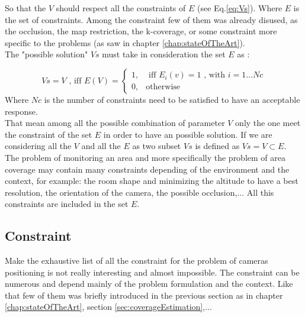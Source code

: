 So that the $V$ should respect all the constraints of $E$ (see Eq.\ref{eq:Vs}). Where $E$ is the set of constraints. Among the constraint few of them was already disused, as the occlusion, the map restriction, the k-coverage, or some constraint more specific to the problems (as saw in chapter \ref{chap:stateOfTheArt}).\\
 The "possible solution" $Vs$ must take in consideration the set $E$ as :

\begin{equation}\label{eq:Vs}
Vs=V \mbox{ , iff } E(V)=\begin{cases}1, & \mbox{  iff } E_i(v)=1 \mbox{ , with } i=1...Nc \\ 0, & \mbox{otherwise} 
\end{cases} 
\end{equation}
Where $Nc$ is the number of constraints need to be satisfied to have an acceptable response.\\
That mean among all the possible combination of parameter $V$ only the one meet the constraint of the set $E$ in order to have an possible solution.  If we are considering  all the $V$ and all the $E$ as two subset $Vs$ is defined as $Vs=V\subset E$.\\ 

The problem of monitoring an area and more specifically the problem of area coverage may contain many constraints depending of the environment and the context, for example: the room shape and minimizing the altitude to have a best resolution, the orientation of the camera, the possible occlusion,... All this constraints are included in the set $E$. \\

\subsection{Constraint}

Make the exhaustive list of all the constraint for the problem of cameras positioning is not really interesting and almost impossible. The constraint can be numerous and depend mainly of the problem formulation and the context. Like that few of them was briefly introduced in the previous section as in chapter \ref{chap:stateOfTheArt}, section \ref{sec:coverageEstimation},...\\

